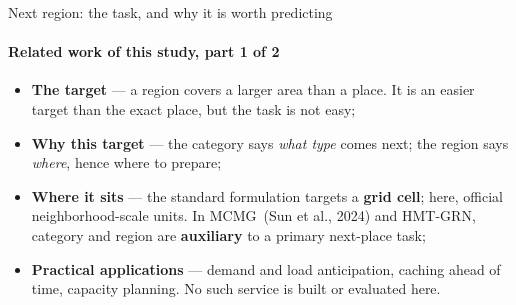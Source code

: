 \documentclass{beamer}
\begin{document}
\begin{frame}{Next region: the task, and why it is worth predicting}
    \framesubtitle{Related work of this study, part 1 of 2}

    \begin{itemize}\setlength{\itemsep}{2ex}
        \item \textbf{The target} --- a region covers a larger area than a place. It is an easier
              target than the exact place, but the task is not easy;
        \item \textbf{Why this target} --- the category says \emph{what type} comes next;
              the region says \emph{where}, hence where to prepare;
        \item \textbf{Where it sits} --- the standard formulation targets a \textbf{grid cell};
              here, official neighborhood-scale units. In MCMG~{\scriptsize(Sun et al., 2024)} and HMT-GRN, category and region
              are \textbf{auxiliary} to a primary next-place task;
        \item \textbf{Practical applications} --- demand and load anticipation, caching ahead of time, capacity
              planning. \alert{No such service is built or evaluated here.}
    \end{itemize}
\end{frame}
\end{document}
